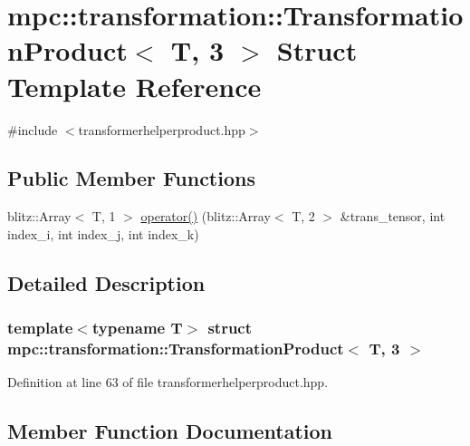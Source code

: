 \hypertarget{structmpc_1_1transformation_1_1_transformation_product_3_01_t_00_013_01_4}{}\section{mpc\+:\+:transformation\+:\+:Transformation\+Product$<$ T, 3 $>$ Struct Template Reference}
\label{structmpc_1_1transformation_1_1_transformation_product_3_01_t_00_013_01_4}


{\ttfamily \#include $<$transformerhelperproduct.\+hpp$>$}

\subsection*{Public Member Functions}
\begin{DoxyCompactItemize}
\item 
blitz\+::\+Array$<$ T, 1 $>$ \mbox{\hyperlink{structmpc_1_1transformation_1_1_transformation_product_3_01_t_00_013_01_4_ade7dbd6c5d3f90dbc1875c3a43c86329}{operator()}} (blitz\+::\+Array$<$ T, 2 $>$ \&trans\+\_\+tensor, int index\+\_\+i, int index\+\_\+j, int index\+\_\+k)
\end{DoxyCompactItemize}


\subsection{Detailed Description}
\subsubsection*{template$<$typename T$>$\newline
struct mpc\+::transformation\+::\+Transformation\+Product$<$ T, 3 $>$}



Definition at line 63 of file transformerhelperproduct.\+hpp.



\subsection{Member Function Documentation}
\mbox{\label{structmpc_1_1transformation_1_1_transformation_product_3_01_t_00_013_01_4_ade7dbd6c5d3f90dbc1875c3a43c86329}} 
